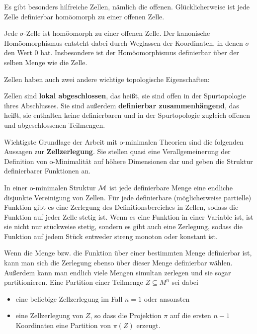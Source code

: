 Es gibt besonders hilfreiche Zellen, nämlich die offenen. Glücklicherweise ist jede Zelle definierbar homöomorph zu einer offenen Zelle.
\begin{fact}
	Jede $\sigma$-Zelle ist homöomorph zu einer offenen Zelle. Der kanonische Homöomorphismus entsteht dabei durch Weglassen der Koordinaten, in denen $\sigma$ den Wert 0 hat. Insbesondere ist der Homöomorphismus definierbar über der selben Menge wie die Zelle.
\end{fact}

Zellen haben auch zwei andere wichtige topologische Eigenschaften:
\begin{fact}
	Zellen sind \textbf{lokal abgeschlossen}, das heißt, sie sind offen in der Spurtopologie ihres Abschlusses. Sie sind außerdem \textbf{definierbar zusammenhängend}, das heißt, sie enthalten keine definierbaren und in der Spurtopologie zugleich offenen und abgeschlossenen Teilmengen.
\end{fact}

Wichtigste Grundlage der Arbeit mit o-minimalen Theorien sind die folgenden Aussagen zur \textbf{Zellzerlegung}. Sie stellen quasi eine Verallgemeinerung der Definition von o-Minimalität auf höhere Dimensionen dar und geben die Struktur definierbarer Funktionen an.
\begin{fact}
	In einer o-minimalen Struktur $\mathcal{M}$ ist jede definierbare Menge eine endliche disjunkte Vereinigung von Zellen. Für jede definierbare (möglicherweise partielle) Funktion gibt es eine Zerlegung des Definitionsbereiches in Zellen, sodass die Funktion auf jeder Zelle stetig ist. Wenn es eine Funktion in einer Variable ist, ist sie nicht nur stückweise stetig, sondern es gibt auch eine Zerlegung, sodass die Funktion auf jedem Stück entweder streng monoton oder konstant ist.
\end{fact}
\begin{remark}
	Wenn die Menge bzw. die Funktion über einer bestimmten Menge definierbar ist, kann man sich die Zerlegung ebenso über dieser Menge definierbar wählen. Außerdem kann man endlich viele Mengen simultan zerlegen und sie sogar partitionieren. Eine Partition einer Teilmenge $Z\subseteq M^n$ sei dabei
	\begin{itemize}
		\item eine beliebige Zellzerlegung im Fall $n=1$ oder ansonsten
		\item eine Zellzerlegung von $Z$, so dass die Projektion $\pi$ auf die ersten $n-1$ Koordinaten eine Partition von $\pi(Z)$ erzeugt.
	\end{itemize}
\end{remark}

